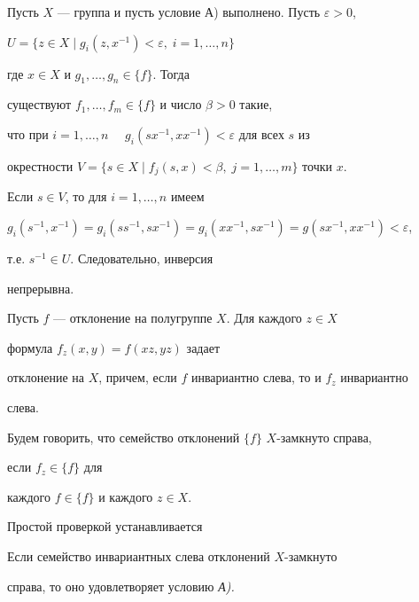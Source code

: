 \begin{pf}
 


Пусть $X$ --- группа и пусть условие А) выполнено. Пусть $\varepsilon>0$, 


$U=\{z\in X\mid g_i(z,x^{-1})<\varepsilon,\;i=1,\dotsc,n\}$ 


где $x\in X$ и $g_1,\dotsc,g_n\in\{f\}$. Тогда 


существуют $f_1,\dotsc,f_m\in\{f\}$ и число $\beta>0$ такие, 


что при $i=1,\dotsc,n\quad$ $g_i(sx^{-1},xx^{-1})<\varepsilon$ для всех $s$ из 


окрестности $V=\{s\in X\mid f_j(s,x)<\beta,\;j=1,\dotsc,m\}$ точки $x$. 


Если $s\in V$, то для $i=1,\dotsc,n$ имеем 


$g_i(s^{-1},x^{-1})=g_i(ss^{-1},sx^{-1})=g_i(xx^{-1},sx^{-1})= 


g(sx^{-1},xx^{-1})<\varepsilon$, 


т.е. $s^{-1}\in U$. Следовательно, инверсия 


непрерывна.


\end{pf} 


 


Пусть $f$ --- отклонение на полугруппе $X$. Для каждого $z\in X$ 


формула $f_z(x,y)=f(xz,yz)$ задает 


отклонение на $X$, причем, если $f$ инвариантно слева, то и $f_z$ инвариантно 


слева. 


 


Будем говорить, что семейство отклонений $\{f\}$ $X$-замкнуто справа, 


если $f_z\in\{f\}$ для 


каждого $f\in\{f\}$ и каждого $z\in X$. 


 


Простой проверкой устанавливается 


 


\begin{thm} Если семейство инвариантных слева отклонений $X$-замкнуто 


справа, то оно удовлетворяет условию {\em А).} 


\end{thm} 


